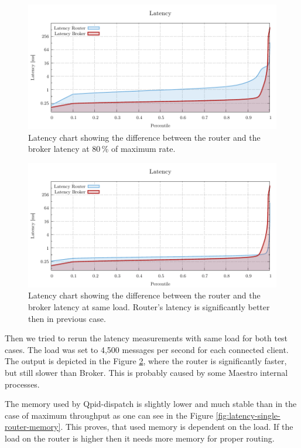 \begin{figure}[H]
	\centering
	\includegraphics[width=1\linewidth]{obrazky-figures/charts/singlepoint-latency.pdf}
	\caption{Latency chart showing the difference between the router and the broker latency at 80\,\% of maximum rate.}
	\label{fig:latency-single-router}
\end{figure}

\begin{figure}[H]
	\centering
	\includegraphics[width=1\linewidth]{obrazky-figures/charts/singlepoint-latency-18k.pdf}
	\caption{Latency chart showing the difference between the router and the broker latency at same load. Router's latency is significantly better then in previous case.}
	\label{fig:latency-single-same-load}
\end{figure}

Then we tried to rerun the latency measurements with same load for both test cases. The load was set to 4,500 messages per second for each connected client. The output is depicted in the Figure \ref{fig:latency-single-same-load}, where the router is significantly faster, but still slower than Broker. This is probably caused by some Maestro internal processes.

The memory used by Qpid-dispatch is slightly lower and much stable than in the case of maximum throughput as one can see in the Figure \ref{fig:latency-single-router-memory}. This proves, that used memory is dependent on the load. If the load on the router is higher then it needs more memory for proper routing.

